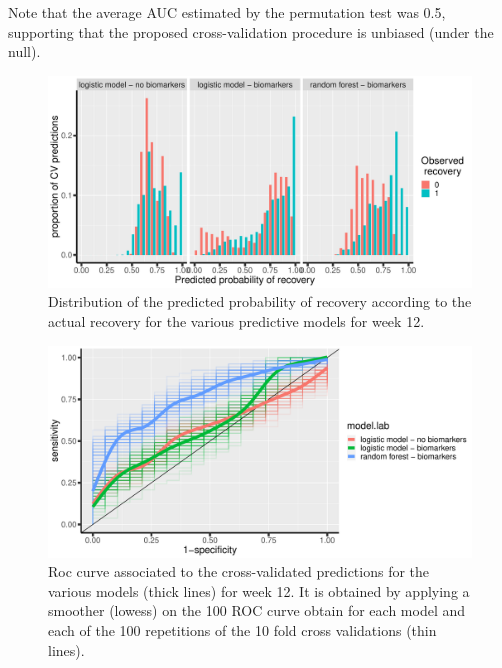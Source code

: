 \documentclass[12pt]{article}
\begin{document}
\bigskip

Note that the average AUC estimated by the permutation test was 0.5,
supporting that the proposed cross-validation procedure is unbiased
(under the null).

\clearpage

\begin{figure}[!h]
\centering
\includegraphics[trim={0 0 0 0},width=1\textwidth]{./figures/gg-perfW12-hist2.pdf}
\caption{\label{fig:predW12}Distribution of the predicted probability of recovery according to the actual recovery for the various predictive models for week 12.}
\end{figure}

\begin{figure}[!h]
\centering
\includegraphics[trim={0 0 0 0},width=1\textwidth]{./figures/gg-perfW12-roc.pdf}
\caption{\label{fig:rocW12}Roc curve associated to the cross-validated predictions for the various models (thick lines) for week 12. It is obtained by applying a smoother (lowess) on the 100 ROC curve obtain for each model and each of the 100 repetitions of the 10 fold cross validations (thin lines).}
\end{figure}


\clearpage
\end{document}
